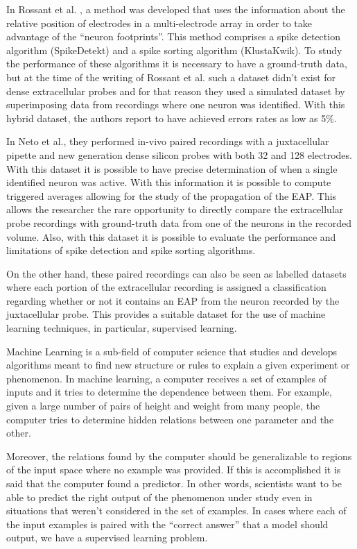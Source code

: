 In Rossant et al. \cite{Rossant2016}, a method was developed that uses the information about the relative position of electrodes in a multi-electrode array in order to take advantage of the “neuron footprints”. This method comprises a spike detection algorithm (SpikeDetekt) and a spike sorting algorithm (KlustaKwik). To study the performance of these algorithms it is necessary to have a ground-truth data, but at the time of the writing of Rossant et al. such a dataset didn't exist for dense extracellular probes and for that reason they used a simulated dataset by superimposing data from recordings where one neuron was identified. With this hybrid dataset, the authors report to have achieved errors rates as low as 5\%.

In Neto et al., they performed in-vivo paired recordings with a juxtacellular pipette and new generation dense silicon probes with both 32 and 128 electrodes. With this dataset it is possible to have precise determination of when a single identified neuron was active. With this information it is possible to compute triggered averages allowing for the study of the propagation of the EAP. This allows the researcher the rare opportunity to directly compare the extracellular probe recordings with ground-truth data from one of the neurons in the recorded volume. Also, with this dataset it is possible to evaluate the performance and limitations of spike detection and spike sorting algorithms.

On the other hand, these paired recordings can also be seen as labelled datasets where each portion of the extracellular recording is assigned a classification regarding whether or not it contains an EAP from the neuron recorded by the juxtacellular probe. This provides a suitable dataset for the use of machine learning techniques, in particular, supervised learning.

Machine Learning is a sub-field of computer science that studies and develops algorithms meant to find new structure or rules to explain a given experiment or phenomenon. In machine learning, a computer receives a set of examples of inputs and it tries to determine the dependence between them. For example, given a large number of pairs of height and weight from many people, the computer tries to determine hidden relations between one parameter and the other.
 
Moreover, the relations found by the computer should be generalizable to regions of the input space where no example was provided. If this is accomplished it is said that the computer found a predictor. In other words, scientists want to be able to predict the right output of the phenomenon under study even in situations that weren't considered in the set of examples. 
In cases where each of the input examples is paired with the “correct answer” that a model should output, we have a supervised learning problem.

